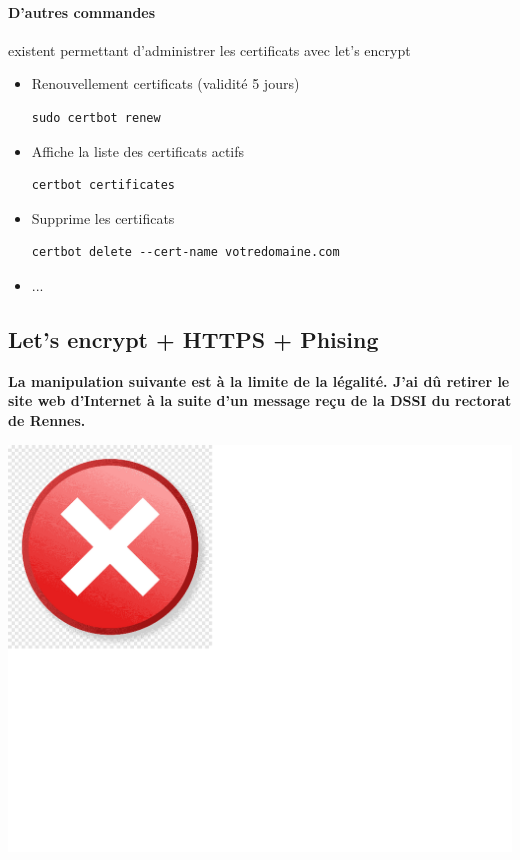 \documentclass[french, 12pt]{article}%
\newcommand{\itemE}{\item[$\bullet$]}
\begin{document}
\paragraph{D'autres commandes} existent permettant d'administrer les certificats avec let's encrypt 
\begin{itemize}
\itemE Renouvellement certificats (validité 5 jours)
\begin{lstlisting}[style=commande]
sudo certbot renew
\end{lstlisting}
\itemE Affiche la liste des certificats actifs 
\begin{lstlisting}[style=commande]
certbot certificates
\end{lstlisting}

\itemE Supprime les certificats
\begin{lstlisting}[style=commande]
certbot delete --cert-name votredomaine.com
\end{lstlisting}
\itemE ...
\end{itemize}


\subsection{Let's encrypt + HTTPS + Phising}


\begin{minipage}[c]{0.6\linewidth}
\textbf{La manipulation suivante est à la limite de la légalité. J'ai dû retirer le site web d'Internet à la suite d'un message reçu de la DSSI du rectorat de Rennes.}
\end{minipage}
\begin{minipage}[c]{0.4\linewidth}
\begin{center}
\includegraphics[scale=0.1]{./ressource/noOK}
\end{center}
\end{minipage}
\end{document}
